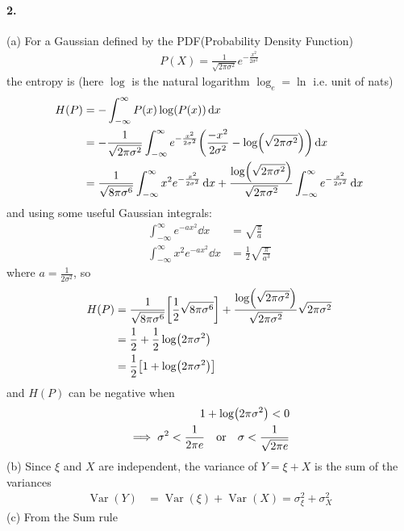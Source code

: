 \documentclass[../main.tex]{subfiles}
\newcommand{\Var}{\operatorname{Var}}
\begin{document}
\paragraph*{2.} (a) For a Gaussian defined by the PDF(Probability Density Function)
\begin{align*}
    P(X) = \frac{1}{\sqrt{2\pi\sigma^2}} e^{-\frac{x^2}{2\sigma^2}}
\end{align*}
the entropy is (here $\log$ is the natural logarithm $\log_e = \ln$ i.e. unit of nats)
\begin{align*}
    H(P) &= -\int_{-\infty}^\infty P(x) \log(P(x)) \dd{x} \\
    &= -\frac{1}{\sqrt{2\pi\sigma^2}} \int_{-\infty}^\infty e^{-\frac{x^2}{2\sigma^2}} 
        \qt(\frac{-x^2}{2\sigma^2} - \log(\sqrt{2\pi\sigma^2})) \dd{x} \\
    &= \frac{1}{\sqrt{8\pi\sigma^6}} \int_{-\infty}^\infty x^2 e^{-\frac{x^2}{2\sigma^2}} \dd{x} 
        + \frac{\log(\sqrt{2\pi\sigma^2})}{\sqrt{2\pi\sigma^2}} \int_{-\infty}^\infty e^{-\frac{x^2}{2\sigma^2}} \dd{x} \\
\end{align*}
and using some useful Gaussian integrals:
\begin{align*}
    \int_{-\infty}^\infty e^{-ax^2} \dd{x} &= \sqrt{\frac{\pi}{a}} \\
    \int_{-\infty}^\infty x^2 e^{-ax^2} \dd{x} &= \frac{1}{2} \sqrt{\frac{\pi}{a^3}}
\end{align*}
where $a = \frac{1}{2\sigma^2}$, so
\begin{align*}
    H(P) &= \frac{1}{\sqrt{8\pi\sigma^6}} \qt[\frac{1}{2} \sqrt{8\pi\sigma^6}] 
        + \frac{\log(\sqrt{2\pi\sigma^2})}{\sqrt{2\pi\sigma^2}} \sqrt{2\pi\sigma^2} \\
    &= \frac{1}{2} + \frac{1}{2} \log(2\pi\sigma^2) \\
    &= \frac{1}{2} \qt[1 + \log(2\pi\sigma^2)]
\end{align*}
and $H(P)$ can be negative when
\begin{align*}
    1 + \log(2\pi\sigma^2) < 0 \\
    \implies \sigma^2 < \frac{1}{2\pi e} \qor \sigma < \frac{1}{\sqrt{2\pi e}}
\end{align*}
(b) Since $\xi$ and $X$ are independent, the variance of $Y = \xi + X$ is the sum of the variances
\begin{align*}
    \Var(Y) &= \Var(\xi) + \Var(X) = \sigma_\xi^2 + \sigma_X^2
\end{align*}
(c) From the Sum rule
\end{document}
